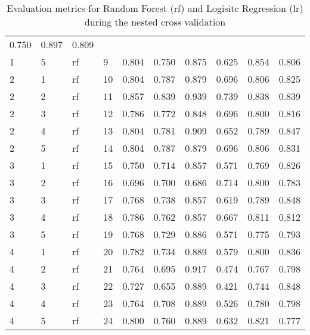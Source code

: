 \begin{table}[ht]
\begin{adjustbox}{width=\textwidth}
\begin{tabular}{llllrrrrrr}
 0.750 & 0.897 & 0.809 \\
   1 &           5 &    rf &           9 & 0.804 &  0.750 &        0.875 &       
 0.625 & 0.854 & 0.806 \\
   2 &           1 &    rf &          10 & 0.804 &  0.787 &        0.879 &       
 0.696 & 0.806 & 0.825 \\
   2 &           2 &    rf &          11 & 0.857 &  0.839 &        0.939 &       
 0.739 & 0.838 & 0.839 \\
   2 &           3 &    rf &          12 & 0.786 &  0.772 &        0.848 &       
 0.696 & 0.800 & 0.816 \\
   2 &           4 &    rf &          13 & 0.804 &  0.781 &        0.909 &       
 0.652 & 0.789 & 0.847 \\
   2 &           5 &    rf &          14 & 0.804 &  0.787 &        0.879 &       
 0.696 & 0.806 & 0.831 \\
   3 &           1 &    rf &          15 & 0.750 &  0.714 &        0.857 &       
 0.571 & 0.769 & 0.826 \\
   3 &           2 &    rf &          16 & 0.696 &  0.700 &        0.686 &       
 0.714 & 0.800 & 0.783 \\
   3 &           3 &    rf &          17 & 0.768 &  0.738 &        0.857 &       
 0.619 & 0.789 & 0.848 \\
   3 &           4 &    rf &          18 & 0.786 &  0.762 &        0.857 &       
 0.667 & 0.811 & 0.812 \\
   3 &           5 &    rf &          19 & 0.768 &  0.729 &        0.886 &       
 0.571 & 0.775 & 0.793 \\
   4 &           1 &    rf &          20 & 0.782 &  0.734 &        0.889 &       
 0.579 & 0.800 & 0.836 \\
   4 &           2 &    rf &          21 & 0.764 &  0.695 &        0.917 &       
 0.474 & 0.767 & 0.798 \\
   4 &           3 &    rf &          22 & 0.727 &  0.655 &        0.889 &       
 0.421 & 0.744 & 0.848 \\
   4 &           4 &    rf &          23 & 0.764 &  0.708 &        0.889 &       
 0.526 & 0.780 & 0.798 \\
   4 &           5 &    rf &          24 & 0.800 &  0.760 &        0.889 &       
 0.632 & 0.821 & 0.777 \\
\end{tabular}
\end{adjustbox}
\caption{Evaluation metrics for Random Forest (rf) and Logisitc Regression (lr) 
during the nested cross validation}
\label{tab:storage}
\end{table}
